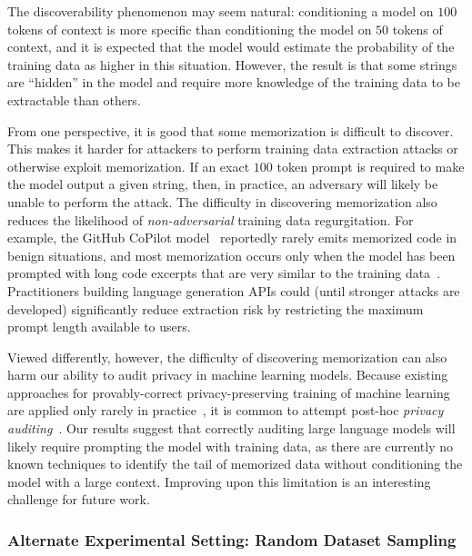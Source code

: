 The discoverability phenomenon may seem natural: conditioning a model on $100$ tokens of context is more specific than conditioning the model on $50$ tokens of context, and it is expected that the model would estimate the probability of the training data as higher in this situation. 
However, the result is that some strings are ``hidden'' in the model and require more knowledge of the training data to be extractable than others.

From one perspective, it is good that some memorization is difficult to discover.
This makes it harder for attackers to perform training data extraction attacks \citep{carlini2020extracting}
or otherwise exploit memorization.
If an exact $100$ token prompt is required to make the model output a given string, then, in practice, an adversary will likely be unable to perform the attack.
%
The difficulty in discovering memorization also reduces the likelihood of \emph{non-adversarial} training data regurgitation.
For example, the GitHub CoPilot model~\citep{chen2021evaluating} reportedly rarely emits memorized code in benign situations, and most memorization occurs only when the model has been prompted with long code excerpts that are very similar to the training data~\citep{ziegler2021copilot}.
Practitioners building language generation APIs could (until stronger attacks are developed) significantly reduce extraction risk by restricting the maximum prompt length available to users.

Viewed differently, however, the difficulty of discovering memorization
can also harm our ability to audit privacy in machine learning models.
%
Because existing approaches for provably-correct privacy-preserving training of machine learning are applied only rarely in practice~\citep{abadi2016deep, thakkar2020understanding, ramaswamy2020training},
it is common to attempt post-hoc \emph{privacy auditing}~\citep{jayaraman2019evaluating, jagielski2020auditing, nasr2021adversary}.
%
Our results suggest that correctly auditing large language models will likely require prompting the model with training data, as there are currently no known techniques to identify the tail of memorized data without conditioning the model with a large context.
%
Improving upon this limitation is an interesting challenge for future work.


    

    
\subsubsection{Alternate Experimental Setting: Random Dataset Sampling}
\label{section:other_approaches}


